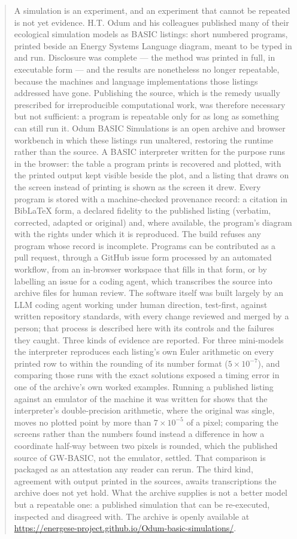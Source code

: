 \begin{abstract}
A simulation is an experiment, and an experiment that cannot be repeated is not yet evidence. H.T. Odum and his colleagues published many of their ecological simulation models as BASIC listings: short numbered programs, printed beside an Energy Systems Language diagram, meant to be typed in and run. Disclosure was complete --- the method was printed in full, in executable form --- and the results are nonetheless no longer repeatable, because the machines and language implementations those listings addressed have gone. Publishing the source, which is the remedy usually prescribed for irreproducible computational work, was therefore necessary but not sufficient: a program is repeatable only for as long as something can still run it. Odum BASIC Simulations is an open archive and browser workbench in which these listings run unaltered, restoring the runtime rather than the source. A BASIC interpreter written for the purpose runs in the browser: the table a program prints is recovered and plotted, with the printed output kept visible beside the plot, and a listing that draws on the screen instead of printing is shown as the screen it drew. Every program is stored with a machine-checked provenance record: a citation in BibLaTeX form, a declared fidelity to the published listing (verbatim, corrected, adapted or original) and, where available, the program's diagram with the rights under which it is reproduced. The build refuses any program whose record is incomplete. Programs can be contributed as a pull request, through a GitHub issue form processed by an automated workflow, from an in-browser workspace that fills in that form, or by labelling an issue for a coding agent, which transcribes the source into archive files for human review. The software itself was built largely by an LLM coding agent working under human direction, test-first, against written repository standards, with every change reviewed and merged by a person; that process is described here with its controls and the failures they caught. Three kinds of evidence are reported. For three mini-models the interpreter reproduces each listing's own Euler arithmetic on every printed row to within the rounding of its number format ($5\times10^{-7}$), and comparing those runs with the exact solutions exposed a timing error in one of the archive's own worked examples. Running a published listing against an emulator of the machine it was written for shows that the interpreter's double-precision arithmetic, where the original was single, moves no plotted point by more than $7\times10^{-5}$ of a pixel; comparing the screens rather than the numbers found instead a difference in how a coordinate half-way between two pixels is rounded, which the published source of GW-BASIC, not the emulator, settled. That comparison is packaged as an attestation any reader can rerun. The third kind, agreement with output printed in the sources, awaits transcriptions the archive does not yet hold. What the archive supplies is not a better model but a repeatable one: a published simulation that can be re-executed, inspected and disagreed with. The archive is openly available at \url{https://energese-project.github.io/Odum-basic-simulations/}.

\end{abstract}
